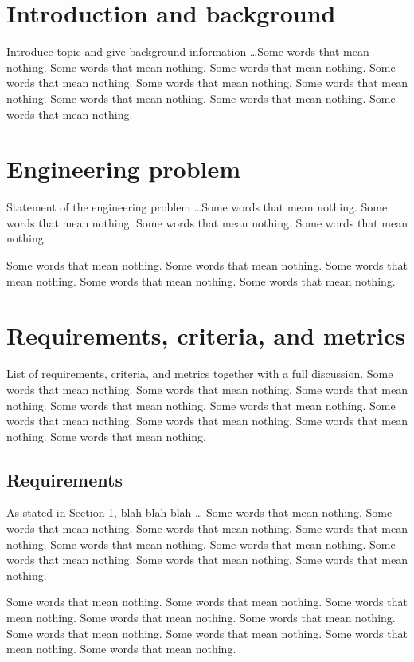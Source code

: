 \documentclass[11pt, a4paper]{article}
\begin{document}
\section{Introduction and background}
\label{sec:intro}

Introduce topic and give background information \ldots Some words that mean nothing. Some words that mean nothing. Some words that mean nothing. Some words that mean nothing. Some words that mean nothing. Some words that mean nothing. Some words that mean nothing. Some words that mean nothing. Some words that mean nothing.

\section{Engineering problem}
\label{sec:eng_problem}
Statement of the engineering problem \ldots Some words that mean nothing. Some words that mean nothing. Some words that mean nothing. Some words that mean nothing.

Some words that mean nothing. Some words that mean nothing. Some words that mean nothing. Some words that mean nothing. Some words that mean nothing.

\section{Requirements, criteria, and metrics}
List of requirements, criteria, and metrics together with a full discussion. Some words that mean nothing. Some words that mean nothing. Some words that mean nothing. Some words that mean nothing. Some words that mean nothing. Some words that mean nothing. Some words that mean nothing. Some words that mean nothing. Some words that mean nothing.

\subsection{Requirements}
As stated in Section \ref{sec:intro}, blah blah blah \ldots
Some words that mean nothing. Some words that mean nothing. Some words that mean nothing. Some words that mean nothing. Some words that mean nothing. Some words that mean nothing. Some words that mean nothing. Some words that mean nothing. Some words that mean nothing.

Some words that mean nothing. Some words that mean nothing. Some words that mean nothing. Some words that mean nothing. Some words that mean nothing. Some words that mean nothing. Some words that mean nothing. Some words that mean nothing. Some words that mean nothing.
\end{document}
